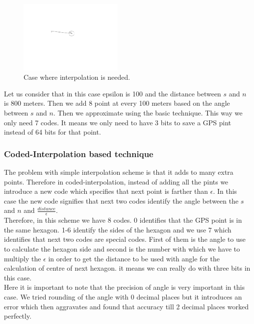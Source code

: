 \documentclass[conference]{IEEEtran}
\begin{document}
\begin{figure}[ht]
  \centering
  \includegraphics[width=2in]{images/interpolation.pdf}
  \caption {Case where interpolation is needed.}
  \label{fig:basic-interpolation}
\end{figure}

Let us consider that in this case epsilon is 100 and the distance between $s$ and $n$ is 800 meters. Then we add 
8 point at every 100 meters based on the angle between $s$ and $n$. Then we approximate using the basic technique. 
This way we only need 7 codes. It means we only need to have 3 bits to save a GPS pint instead of 64 bits for that point. 

\subsubsection{Coded-Interpolation based technique}

The problem with simple interpolation scheme is that it adds to many extra points. Therefore in coded-interpolation, 
 instead of adding all the pints we introduce a new code which specifies that next point is farther than $\epsilon$. In 
 this case the new code signifies that next two codes identify the angle between the $s$ and $n$ and 
 $\frac{distance}{\epsilon}$.\\
 Therefore, in this scheme we have 8 codes. 0 identifies that the GPS point is in the same hexagon. 1-6 identify the 
 sides of the hexagon and we use 7 which identifies that next two codes are special codes. First of them is the angle 
 to use to calculate the hexagon side and second is the number with which we have to multiply the $\epsilon$ in order 
 to get the distance to be used with angle for the calculation of centre of next hexagon. it means we can really do with three bits in this case.\\
 Here it is important to note that the precision of angle is very important in this case. We tried rounding of the angle with 
 0 decimal places but it introduces an error which then aggravates and found that accuracy till 2 decimal places worked perfectly.
 
\end{document}

